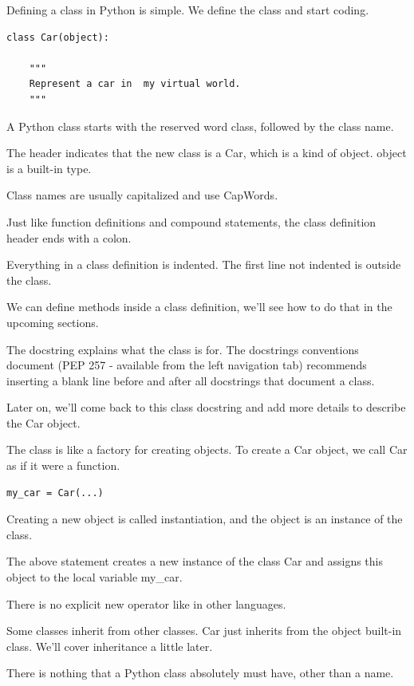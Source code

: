 \documentclass{article}
\begin{document}
Defining a class in Python is simple. We define the class and start coding. 

\begin{lstlisting}
class Car(object):
   
    """
    Represent a car in  my virtual world.
    """
\end{lstlisting}
    
A Python class starts with the reserved word class, followed by the class name.

The header indicates that the new class is a Car, which is a kind of object. object is a built-in type.

Class names are usually capitalized and use CapWords.

Just like function definitions and compound statements, the class definition header ends with a colon.

Everything in a class  definition is indented. The first line not indented is outside the class.

We can define methods inside a class definition, we'll see how to do that in the upcoming sections.

The docstring  explains what the class is for. The docstrings conventions document (PEP 257 - available from the left navigation tab) recommends inserting  a blank line before and after all docstrings that document a class.

Later on, we'll come back to this class docstring and add more details to describe the Car object.

The class is like a factory for creating objects. To create a Car object, we call Car as if it were a function.

\begin{lstlisting}
my_car = Car(...)
\end{lstlisting}

Creating a new object is called instantiation, and the object is an instance of the class.

The above statement creates a new instance of the class Car and assigns this object to the local variable my{\_}car.

There is no explicit new operator like in other languages.

Some classes inherit from other classes.  Car just inherits from the object built-in class.   We’ll cover inheritance a little later.

There is nothing that a Python class absolutely must have, other than a name. 
\end{document}
